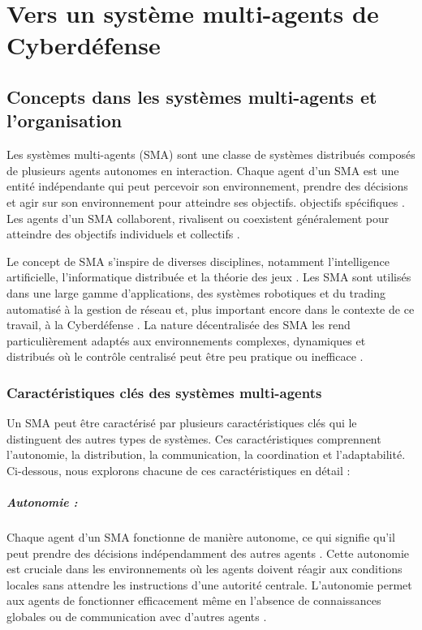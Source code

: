 \chapter{Vers un système multi-agents de Cyberdéfense}\label{ch:towards_cSMA}

\section{Concepts dans les systèmes multi-agents et l'organisation}

Les systèmes multi-agents (SMA) sont une classe de systèmes distribués composés de plusieurs agents autonomes en interaction. Chaque agent d'un SMA est une entité indépendante qui peut percevoir son environnement, prendre des décisions et agir sur son environnement pour atteindre ses objectifs. objectifs spécifiques \cite{ferber1999multi}. Les agents d'un SMA collaborent, rivalisent ou coexistent généralement pour atteindre des objectifs individuels et collectifs \cite{weiss1999multiagent}.

Le concept de SMA s'inspire de diverses disciplines, notamment l'intelligence artificielle, l'informatique distribuée et la théorie des jeux \cite{shoham2008multiagent}. Les SMA sont utilisés dans une large gamme d'applications, des systèmes robotiques et du trading automatisé à la gestion de réseau et, plus important encore dans le contexte de ce travail, à la Cyberdéfense \cite{jennings1998applications, shakarian2015cyber}. La nature décentralisée des SMA les rend particulièrement adaptés aux environnements complexes, dynamiques et distribués où le contrôle centralisé peut être peu pratique ou inefficace \cite{sycara1998multiagent}.

\subsection{Caractéristiques clés des systèmes multi-agents}

Un SMA peut être caractérisé par plusieurs caractéristiques clés qui le distinguent des autres types de systèmes. Ces caractéristiques comprennent l'autonomie, la distribution, la communication, la coordination et l'adaptabilité. Ci-dessous, nous explorons chacune de ces caractéristiques en détail :

\paragraph{Autonomie :}
Chaque agent d'un SMA fonctionne de manière autonome, ce qui signifie qu'il peut prendre des décisions indépendamment des autres agents \cite{jennings1998applications}. Cette autonomie est cruciale dans les environnements où les agents doivent réagir aux conditions locales sans attendre les instructions d'une autorité centrale. L'autonomie permet aux agents de fonctionner efficacement même en l'absence de connaissances globales ou de communication avec d'autres agents \cite{russell2016artificial}.

